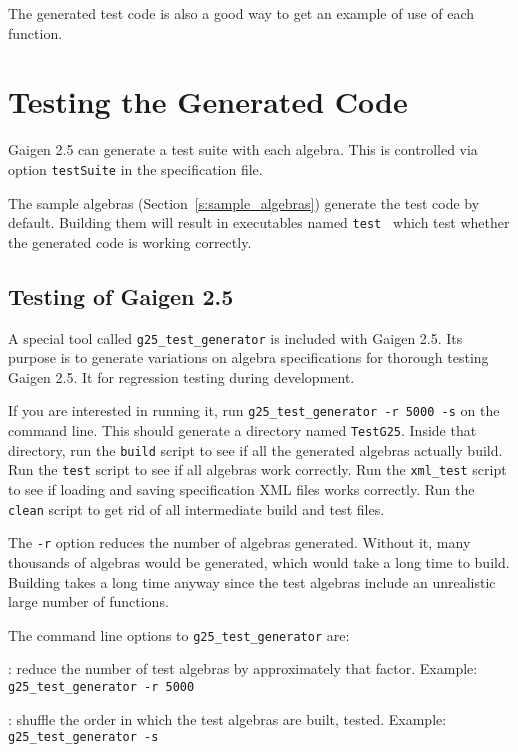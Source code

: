 \documentclass[10pt, a4paper]{article}
\begin{document}
The generated test code is also a good way to get an example
of use of each function.

\section{Testing the Generated Code}

Gaigen 2.5 can generate a test suite with each algebra.
This is controlled via option {\tt testSuite} in the specification file.

The sample algebras (Section~\ref{s:sample_algebras}) generate the test 
code by default. Building them will result in executables named 
{\tt test } which test whether the generated code is working correctly. 


\subsection{Testing of Gaigen 2.5}

A special tool called {\tt g25\_test\_generator} is included with Gaigen 2.5.
Its purpose is to generate variations on algebra specifications for thorough testing
Gaigen 2.5. It for regression testing during development. 

If you are interested in running it, run {\tt g25\_test\_generator -r 5000 -s} on
the command line.
This should generate a directory named {\tt TestG25}. 
Inside that directory, run the {\tt build} script to see if all the
generated algebras actually build. Run the {\tt test} script to see if
all algebras work correctly. Run the {\tt xml\_test} script to see if
loading and saving specification XML files works correctly.
Run the {\tt clean} script to get rid of all intermediate build and test
files.

The {\tt -r} option reduces the number of algebras generated. Without it,
many thousands of algebras would be generated, which would take a long time to build.
Building takes a long time anyway since the test algebras include an unrealistic
large number of functions.

The command line options to {\tt g25\_test\_generator} are:
\vspace*{2mm}

: reduce the number of test algebras by approximately that factor.
Example: {\tt g25\_test\_generator -r 5000}

\vspace*{2mm}

: shuffle the order in which the test algebras are built, tested.
Example: {\tt g25\_test\_generator -s}
\end{document}
